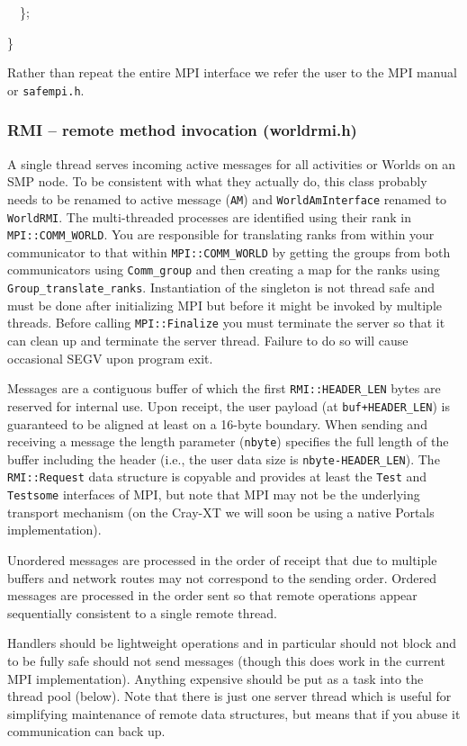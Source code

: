 \documentclass[letterpaper]{article}
\begin{document}
{\ttfamily
\ \ \};}

{\ttfamily
\}}

Rather than repeat the entire MPI interface we refer the user to the MPI manual or \texttt{safempi.h}. 

\subsubsection{RMI -- remote method invocation (worldrmi.h)}
A single thread serves incoming active messages for all activities or Worlds on an SMP node. To be consistent with what
they actually do, this class probably needs to be renamed to active message (\texttt{AM}) and \texttt{WorldAmInterface}
renamed to \texttt{WorldRMI}. The multi-threaded processes are identified using their rank in
\texttt{MPI::COMM\_WORLD}. You are responsible for translating ranks from within your communicator to that within
\texttt{MPI::COMM\_WORLD} by getting the groups from both communicators using \texttt{Comm\_group} and then creating a
map for the ranks using \texttt{Group\_translate\_ranks}. Instantiation of the singleton is not thread safe and must be
done after initializing MPI but before it might be invoked by multiple threads. Before calling \texttt{MPI::Finalize}
you must terminate the server so that it can clean up and terminate the server thread. Failure to do so will cause
occasional SEGV upon program exit.

Messages are a contiguous buffer of which the first \texttt{RMI::HEADER\_LEN} bytes are reserved for internal use. Upon
receipt, the user payload (at \texttt{buf+HEADER\_LEN}) is guaranteed to be aligned at least on a 16-byte boundary.
When sending and receiving a message the length parameter (\texttt{nbyte}) specifies the full length of the buffer
including the header (i.e., the user data size is \texttt{nbyte-HEADER\_LEN}). The \texttt{RMI::Request} data structure
is copyable and provides at least the \texttt{Test} and \texttt{Testsome} interfaces of MPI, but note that MPI may not
be the underlying transport mechanism (on the Cray-XT we will soon be using a native Portals implementation).

Unordered messages are processed in the order of receipt that due to multiple buffers and network routes may not
correspond to the sending order. Ordered messages are processed in the order sent so that remote operations appear
sequentially consistent to a single remote thread.

Handlers should be lightweight operations and in particular should not block and to be fully safe should not send
messages (though this does work in the current MPI implementation). Anything expensive should be put as a task into the
thread pool (below). Note that there is just one server thread which is useful for simplifying maintenance of remote
data structures, but means that if you abuse it communication can back up.
\end{document}
